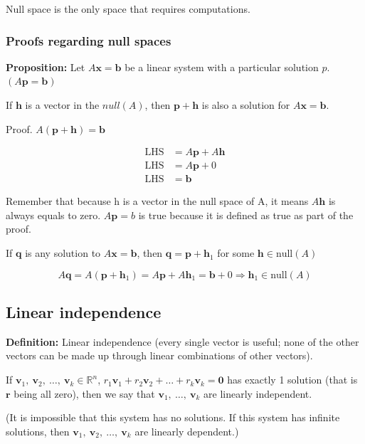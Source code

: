 \documentclass[12pt]{article}
\theoremstyle{plain}
\theoremstyle{remark}
\theoremstyle{definition}
\begin{document}
Null space is the only space that requires computations.


\subsubsection{Proofs regarding null
spaces}

\textbf{Proposition:} Let \(A\mathbf{x} = \mathbf{b}\) be a
linear system with a particular solution \(p\).
\((A\mathbf{p} = \mathbf{b})\)

If \(\mathbf{h}\) is a vector in the \(null(A)\), then
\(\mathbf{p} + \mathbf{h}\) is also a solution for
\(A\mathbf{x} = \mathbf{b}\).

Proof.
\(A\left( \mathbf{p} + \mathbf{h} \right) = \mathbf{b}\)

\begin{align*}
\text{LHS} &= A\mathbf{p} + A\mathbf{h} \\
\text{LHS} &= A\mathbf{p} + 0 \\
\text{LHS} &= \mathbf{b}
\end{align*}


Remember that because h is a vector in the null space of A, it means
\(A\mathbf{h}\) is always equals to zero. \(A\mathbf{p} = b\) is
true because it is defined as true as part of the proof.

If \(\mathbf{q}\) is any solution to
\(A\mathbf{x} = \mathbf{b}\), then
\(\mathbf{q} = \mathbf{p} + {\mathbf{h}}_{1}\) for some
\(\mathbf{h} \in \text{null}(A)\)

\[A\mathbf{q} = A\left( \mathbf{p} + {\mathbf{h}}_{1} \right) = A\mathbf{p} + A{\mathbf{h}}_{1} = \mathbf{b} + 0 \Rightarrow {\mathbf{h}}_{1} \in \text{null}(A)\]


\subsection{Linear independence}

\textbf{Definition:} Linear independence (every single vector is useful;
none of the other vectors can be made up through linear combinations of
other vectors).

If
\({\mathbf{v}}_{1},\ {\mathbf{v}}_{2},\ \ldots,\ {\mathbf{v}}_{k} \in \mathbb{R}^{n}\),
\(r_{1}{\mathbf{v}}_{1} + r_{2}{\mathbf{v}}_{2} + \ldots + r_{k}{\mathbf{v}}_{k} = \mathbf{0}\)
has exactly 1 solution (that is \(\mathbf{r}\) being all zero), then
we say that \({\mathbf{v}}_{1},\ \ldots,\ {\mathbf{v}}_{k}\) are
linearly independent.

(It is impossible that this system has no solutions. If this system has
infinite solutions, then
\({\mathbf{v}}_{1},\ {\mathbf{v}}_{2},\ \ldots,\ {\mathbf{v}}_{k}\)
are linearly dependent.)
\end{document}
